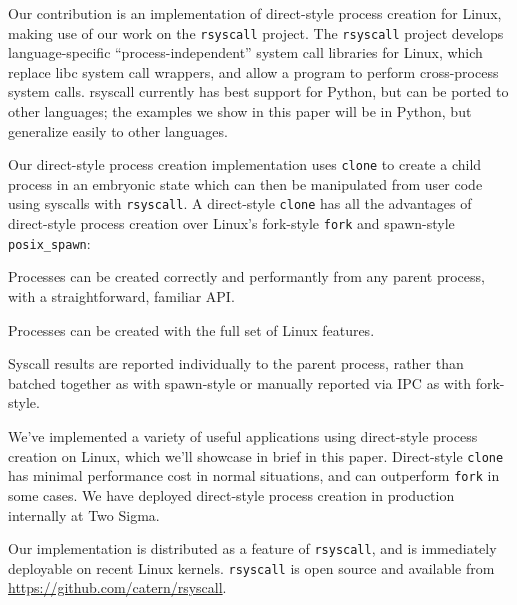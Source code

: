 \documentclass[letterpaper,twocolumn,10pt]{article}
\begin{document}
Our contribution is an implementation of direct-style process creation for Linux,
making use of our work on the \texttt{rsyscall} project.
The \texttt{rsyscall} project develops language-specific ``process-independent'' system call libraries for Linux,
which replace libc system call wrappers, and allow a program to perform cross-process system calls.
rsyscall currently has best support for Python,
but can be ported to other languages;
the examples we show in this paper will be in Python,
but generalize easily to other languages.

Our direct-style process creation implementation uses \texttt{clone} to create a child process in an embryonic state
which can then be manipulated from user code using syscalls with \texttt{rsyscall}.
A direct-style \texttt{clone} has all the advantages of direct-style process creation
over Linux's fork-style \texttt{fork} and spawn-style \texttt{posix\_spawn}:
\begin{compactitem}
\item
  Processes can be created correctly and performantly from any parent process,
  with a straightforward, familiar API.
\item
  Processes can be created with the full set of Linux features.
\item
  Syscall results are reported individually to the parent process,
  rather than batched together as with spawn-style or manually reported via IPC as with fork-style.
\end{compactitem}

We've implemented a variety of useful applications using direct-style process creation on Linux,
which we'll showcase in brief in this paper.
Direct-style \texttt{clone} has minimal performance cost in normal situations,
and can outperform \texttt{fork} in some cases.
We have deployed direct-style process creation in production internally at Two Sigma.

Our implementation is distributed as a feature of \texttt{rsyscall},
and is immediately deployable on recent Linux kernels.
\texttt{rsyscall} is open source and available from \url{https://github.com/catern/rsyscall}.
\end{document}
